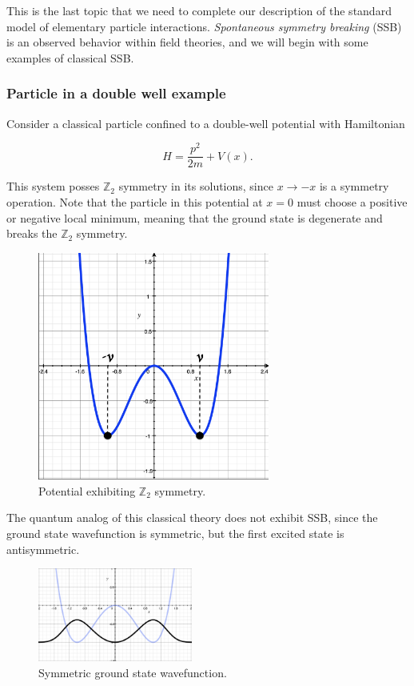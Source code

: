 \noindent This is the last topic that we need to complete our description of the standard model of elementary particle interactions. \textit{Spontaneous symmetry breaking} (SSB) is an observed behavior within field theories, and we will begin with some examples of classical SSB.

\subsubsection*{Particle in a double well example}

\noindent Consider a classical particle confined to a double-well potential with Hamiltonian

\begin{equation}
H = \frac{p^2}{2m} + V(x).
\end{equation}

\noindent This system posses $\mathbb{Z}_2$ symmetry in its solutions, since $x \rightarrow -x$ is a symmetry operation. Note that the particle in this potential at $x=0$ must choose a positive or negative local minimum, meaning that the ground state is degenerate and breaks the $\mathbb{Z}_2$ symmetry. \\

\begin{figure}[H]
	\centering
	\includegraphics[width=3in]{images/mexhat2d.png}
	\caption*{Potential exhibiting $\mathbb{Z}_2$ symmetry.}
\end{figure}

\noindent The quantum analog of this classical theory does not exhibit SSB, since the ground state wavefunction is symmetric, but the first excited state is antisymmetric.

\begin{figure}[H]
	\centering
	\includegraphics[width=2in]{images/mexhat2d_ground.png}
	\caption*{Symmetric ground state wavefunction.}
\end{figure}

